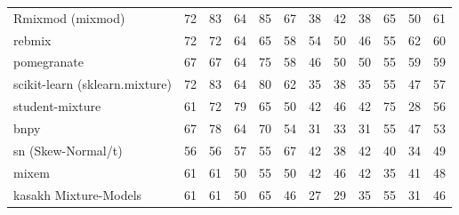 \documentclass[10pt,a4paper]{article}
\begin{document}
{\begin{longtable}{@{}l *{11}{r}@{}}
Rmixmod (mixmod) & \cellcolor{hm!56}72 & \cellcolor{hm!63}83 & \cellcolor{hm!50}64 & \cellcolor{hm!64}85 & \cellcolor{hm!52}67 & \cellcolor{hm!32}38 & \cellcolor{hm!34}42 & \cellcolor{hm!32}38 & \cellcolor{hm!50}65 & \cellcolor{hm!40}50 & \cellcolor{hm!47}61 \\
rebmix & \cellcolor{hm!56}72 & \cellcolor{hm!56}72 & \cellcolor{hm!50}64 & \cellcolor{hm!50}65 & \cellcolor{hm!46}58 & \cellcolor{hm!43}54 & \cellcolor{hm!40}50 & \cellcolor{hm!37}46 & \cellcolor{hm!44}55 & \cellcolor{hm!49}62 & \cellcolor{hm!47}60 \\
pomegranate & \cellcolor{hm!52}67 & \cellcolor{hm!52}67 & \cellcolor{hm!50}64 & \cellcolor{hm!58}75 & \cellcolor{hm!46}58 & \cellcolor{hm!37}46 & \cellcolor{hm!40}50 & \cellcolor{hm!40}50 & \cellcolor{hm!44}55 & \cellcolor{hm!47}59 & \cellcolor{hm!46}59 \\
scikit-learn (sklearn.mixture) & \cellcolor{hm!56}72 & \cellcolor{hm!63}83 & \cellcolor{hm!50}64 & \cellcolor{hm!61}80 & \cellcolor{hm!49}62 & \cellcolor{hm!29}35 & \cellcolor{hm!31}38 & \cellcolor{hm!29}35 & \cellcolor{hm!44}55 & \cellcolor{hm!38}47 & \cellcolor{hm!45}57 \\
student-mixture & \cellcolor{hm!48}61 & \cellcolor{hm!56}72 & \cellcolor{hm!60}79 & \cellcolor{hm!50}65 & \cellcolor{hm!40}50 & \cellcolor{hm!35}42 & \cellcolor{hm!37}46 & \cellcolor{hm!35}42 & \cellcolor{hm!58}75 & \cellcolor{hm!25}28 & \cellcolor{hm!44}56 \\
bnpy & \cellcolor{hm!52}67 & \cellcolor{hm!59}78 & \cellcolor{hm!50}64 & \cellcolor{hm!54}70 & \cellcolor{hm!43}54 & \cellcolor{hm!27}31 & \cellcolor{hm!28}33 & \cellcolor{hm!27}31 & \cellcolor{hm!44}55 & \cellcolor{hm!38}47 & \cellcolor{hm!42}53 \\
sn (Skew-Normal/t) & \cellcolor{hm!44}56 & \cellcolor{hm!44}56 & \cellcolor{hm!45}57 & \cellcolor{hm!44}55 & \cellcolor{hm!52}67 & \cellcolor{hm!35}42 & \cellcolor{hm!31}38 & \cellcolor{hm!35}42 & \cellcolor{hm!33}40 & \cellcolor{hm!29}34 & \cellcolor{hm!39}49 \\
mixem & \cellcolor{hm!48}61 & \cellcolor{hm!48}61 & \cellcolor{hm!40}50 & \cellcolor{hm!44}55 & \cellcolor{hm!40}50 & \cellcolor{hm!35}42 & \cellcolor{hm!37}46 & \cellcolor{hm!35}42 & \cellcolor{hm!30}35 & \cellcolor{hm!33}41 & \cellcolor{hm!39}48 \\
kasakh Mixture-Models & \cellcolor{hm!48}61 & \cellcolor{hm!48}61 & \cellcolor{hm!40}50 & \cellcolor{hm!50}65 & \cellcolor{hm!37}46 & \cellcolor{hm!24}27 & \cellcolor{hm!25}29 & \cellcolor{hm!29}35 & \cellcolor{hm!44}55 & \cellcolor{hm!27}31 & \cellcolor{hm!37}46 \\

\end{longtable}}
\end{document}
